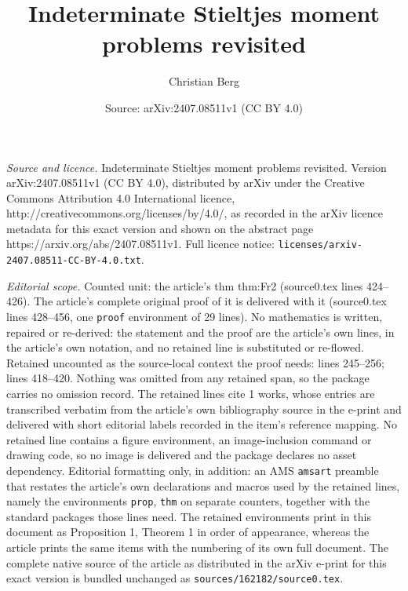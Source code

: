 \documentclass[10pt,a4paper]{amsart}
\title{Indeterminate Stieltjes moment problems revisited}
\author{Christian Berg}
\date{Source: arXiv:2407.08511v1 (CC BY 4.0)}
\begin{document}
\maketitle

\noindent\emph{Source and licence.} Indeterminate Stieltjes moment problems revisited. Version arXiv:2407.08511v1 (CC BY 4.0), distributed by arXiv under the Creative Commons Attribution 4.0 International licence, http://creativecommons.org/licenses/by/4.0/, as recorded in the arXiv licence metadata for this exact version and shown on the abstract page https://arxiv.org/abs/2407.08511v1. Full licence notice: \texttt{licenses/arxiv-2407.08511-CC-BY-4.0.txt}.\par\smallskip

\noindent\textit{Editorial scope.} Counted unit: the article's thm thm:Fr2 (source0.tex lines 424--426). The article's complete original proof of it is delivered with it (source0.tex lines 428--456, one \texttt{proof} environment of 29 lines). No mathematics is written, repaired or re-derived: the statement and the proof are the article's own lines, in the article's own notation, and no retained line is substituted or re-flowed.  Retained uncounted as the source-local context the proof needs: lines 245--256; lines 418--420.  Nothing was omitted from any retained span, so the package carries no omission record.  The retained lines cite 1 works, whose entries are transcribed verbatim from the article's own bibliography source in the e-print and delivered with short editorial labels recorded in the item's reference mapping.  No retained line contains a figure environment, an image-inclusion command or drawing code, so no image is delivered and the package declares no asset dependency.  Editorial formatting only, in addition: an AMS \texttt{amsart} preamble that restates the article's own declarations and macros used by the retained lines, namely the environments \texttt{prop}, \texttt{thm} on separate counters, together with the standard packages those lines need.  The retained environments print in this document as Proposition 1, Theorem 1 in order of appearance, whereas the article prints the same items with the numbering of its own full document.  The complete native source of the article as distributed in the arXiv e-print for this exact version is bundled unchanged as \texttt{sources/162182/source0.tex}.
\end{document}

